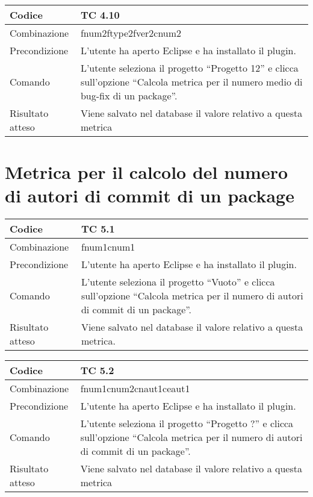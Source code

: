 \begin{table}[ht]
\begin{tabular}{|p{3cm}|p{9cm}|}
\hline
\cellcolor{lightgray}Codice				& TC 4.10								\\
\hline
\cellcolor{lightgray}Combinazione		& fnum2ftype2fver2cnum2 									\\
\hline
\cellcolor{lightgray}Precondizione		& L'utente ha aperto Eclipse e ha installato il plugin.									\\
\hline
\cellcolor{lightgray}Comando			& L'utente seleziona il progetto ``Progetto 12''  e clicca sull'opzione ``Calcola metrica per il numero medio di bug-fix di un package''.	\\
\hline
\cellcolor{lightgray}Risultato atteso	& Viene salvato nel database il valore relativo a questa metrica	\\
\hline
\end{tabular}
\end{table}
\clearpage

\section{Metrica per il calcolo del numero di autori di commit di un package}

\begin{table}[ht]
\begin{tabular}{|p{3cm}|p{9cm}|}
\hline
\cellcolor{lightgray}Codice				& TC 5.1								\\
\hline
\cellcolor{lightgray}Combinazione		& fnum1cnum1									\\
\hline
\cellcolor{lightgray}Precondizione		& L'utente ha aperto Eclipse e ha installato il plugin.		\\
\hline
\cellcolor{lightgray}Comando			& L'utente seleziona il progetto ``Vuoto''  e clicca sull'opzione ``Calcola metrica per il numero di autori di commit di un package''.	\\
\hline
\cellcolor{lightgray}Risultato atteso	& Viene salvato nel database il valore relativo a questa metrica.\\
\hline
\end{tabular}
\end{table}

\begin{table}[ht]
\begin{tabular}{|p{3cm}|p{9cm}|}
\hline
\cellcolor{lightgray}Codice				& TC 5.2								\\
\hline
\cellcolor{lightgray}Combinazione		& fnum1cnum2cnaut1ceaut1 									\\
\hline
\cellcolor{lightgray}Precondizione		& L'utente ha aperto Eclipse e ha installato il plugin.				\\
\hline
\cellcolor{lightgray}Comando			& L'utente seleziona il progetto ``Progetto ?''  e clicca sull'opzione ``Calcola metrica per il numero di autori di commit di un package''.	\\
\hline
\cellcolor{lightgray}Risultato atteso	& Viene salvato nel database il valore relativo a questa metrica	\\
\hline
\end{tabular}
\end{table}

